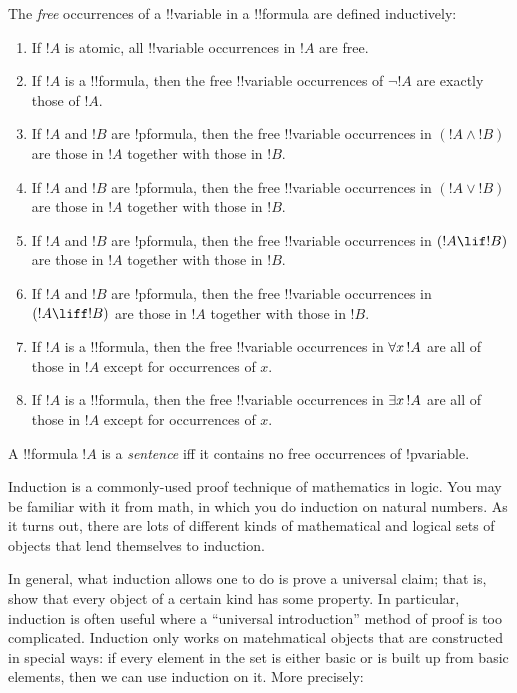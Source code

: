 \documentclass[../../include/open-logic-section]{subfiles}
\begin{document}


\begin{defn}
The \emph{free} occurrences of a !!{variable} in a !!{formula} are defined
inductively:
\begin{enumerate}
\item If $!A$ is atomic, all !!{variable} occurrences in $!A$ are free.
\item If $!A$ is a !!{formula}, then the free !!{variable} occurrences of
  $\lnot !A$ are exactly those of $!A$.
\item If $!A$ and $!B$ are !p{formula}, then the free !!{variable}
  occurrences in $(!A \land !B)$ are those in $!A$ together with those
  in $!B$.
\item If $!A$ and $!B$ are !p{formula}, then the free !!{variable}
  occurrences in $(!A \lor !B)$ are those in $!A$ together with those
  in $!B$.
\item If $!A$ and $!B$ are !p{formula}, then the free !!{variable}
  occurrences in $(!A \lif !B)$ are those in $!A$ together with those
  in $!B$.
\item If $!A$ and $!B$ are !p{formula}, then the free !!{variable}
  occurrences in $(!A \liff !B)$ are those in $!A$ together with those
  in $!B$.
\item If $!A$ is a !!{formula}, then the free !!{variable} occurrences in
  $\lforall[x][!A]$ are all of those in $!A$ except for occurrences of
  $x$.
\item If $!A$ is a !!{formula}, then the free !!{variable} occurrences in
  $\lexists[x][!A]$ are all of those in $!A$ except for occurrences of
  $x$.
\end{enumerate}
\end{defn}

\begin{defn}[Sentence]
A !!{formula} $!A$ is a \emph{sentence} iff it contains no free
occurrences of !p{variable}.
\end{defn}

\begin{explain}
Induction is a commonly-used proof technique of mathematics in logic. 
You may be familiar with it from math, in which you do induction on 
natural numbers. As it turns out, there are lots of different kinds of 
mathematical and logical sets of objects that lend themselves to induction.

In general, what induction allows one to do is prove a universal claim; that 
is, show that every object of a certain kind has some property. In particular, 
induction is often useful where a ``universal introduction'' method of proof 
is too complicated. Induction only works on matehmatical objects that are 
constructed in special ways: if every element in the set is either basic or is 
built up from basic elements, then we can use induction on it. More precisely:
\end{explain}
\end{document}
